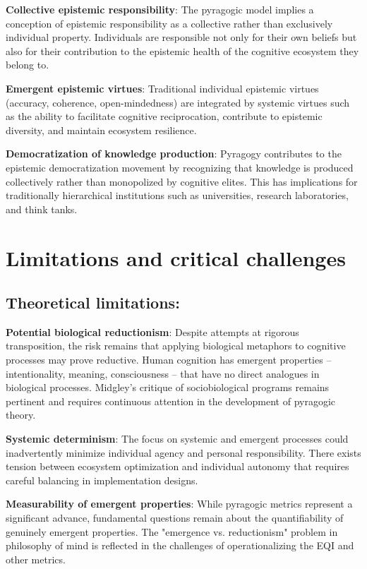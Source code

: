 \textbf{Collective epistemic responsibility}:
The pyragogic model implies a conception of epistemic responsibility as a collective rather than exclusively individual property. Individuals are responsible not only for their own beliefs but also for their contribution to the epistemic health of the cognitive ecosystem they belong to.

\textbf{Emergent epistemic virtues}:
Traditional individual epistemic virtues (accuracy, coherence, open-mindedness) are integrated by systemic virtues such as the ability to facilitate cognitive reciprocation, contribute to epistemic diversity, and maintain ecosystem resilience.

\textbf{Democratization of knowledge production}:
Pyragogy contributes to the epistemic democratization movement by recognizing that knowledge is produced collectively rather than monopolized by cognitive elites. This has implications for traditionally hierarchical institutions such as universities, research laboratories, and think tanks.

\newpage

\section{Limitations and critical challenges}
\subsection*{Theoretical limitations:}

\textbf{Potential biological reductionism}:
Despite attempts at rigorous transposition, the risk remains that applying biological metaphors to cognitive processes may prove reductive. Human cognition has emergent properties -- intentionality, meaning, consciousness -- that have no direct analogues in biological processes. Midgley's \cite{Midgley1979} critique of sociobiological programs remains pertinent and requires continuous attention in the development of pyragogic theory.

\textbf{Systemic determinism}:
The focus on systemic and emergent processes could inadvertently minimize individual agency and personal responsibility. There exists tension between ecosystem optimization and individual autonomy that requires careful balancing in implementation designs.

\textbf{Measurability of emergent properties}:
While pyragogic metrics represent a significant advance, fundamental questions remain about the quantifiability of genuinely emergent properties. The "emergence vs. reductionism" problem in philosophy of mind is reflected in the challenges of operationalizing the EQI and other metrics.

